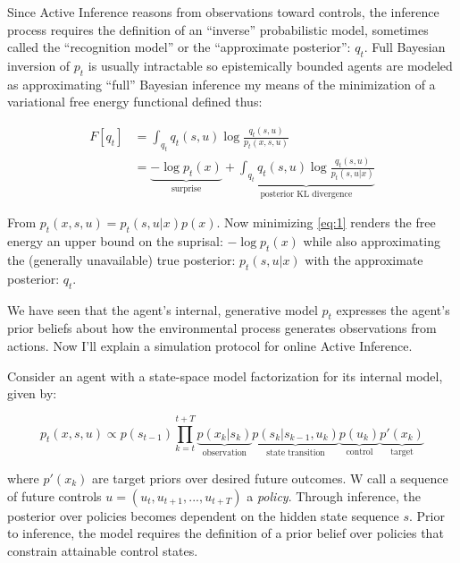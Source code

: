 \documentclass{article}
\begin{document}
Since Active Inference reasons from observations toward controls, the inference process requires the definition of an ``inverse'' probabilistic model, sometimes called the ``recognition model'' or the ``approximate posterior'': $q_t$. Full Bayesian inversion of $p_t$ is usually intractable so epistemically bounded agents are modeled as approximating ``full'' Bayesian inference my means of the minimization of a variational free energy functional defined thus:


\begin{subequations}\label{eq:1}
\begin{align}
F[q_t] &= \int_{q_t} q_t(s, u) \log{\frac{q_t(s, u)}{p_t(x, s, u)}} \label{eq:1a} \\
&= \underbrace{-\log{p_t(x)}}_{\text{surprise}} + \underbrace{\int_{q_t} q_t(s, u) \log{\frac{q_t(s, u)}{p_t(s, u | x)}}}_{\text{posterior KL divergence}} \label{eq:1b}
\end{align}
\end{subequations}


From $p_t(x, s, u) = p_t(s, u | x)p(x)$. Now minimizing \ref{eq:1} renders the free energy an upper bound on the suprisal: $-\log{p_t(x)}$ while also approximating the (generally unavailable) true posterior: $p_t(s, u | x)$ with the approximate posterior: $q_t$.

We have seen that the agent's internal, generative model $p_t$ expresses the agent's prior beliefs about how the environmental process generates observations from actions. Now I'll explain a simulation protocol for online Active Inference. 

Consider an agent with a state-space model factorization for its internal model, given by:

\begin{equation}\label{eq:2}
p_t(x, s, u) \propto p(s_{t-1})\prod_{k = t}^{t + T}\underbrace{p(x_k | s_k)}_{\text{observation}}\underbrace{p(s_k | s_{k-1}, u_k)}_{\text{state transition}}\underbrace{p(u_k)}_{\text{control}}\underbrace{p'(x_k)}_{\text{target}}
\end{equation}

where $p'(x_k)$ are target priors over desired future outcomes. W call a sequence of future controls $u = (u_t, u_{t + 1}, ..., u_{t + T})$ a \textit{policy}. Through inference, the posterior over policies becomes dependent on the hidden state sequence $s$. Prior to inference, the model requires the definition of a prior belief over policies that constrain attainable control states. 
\end{document}

